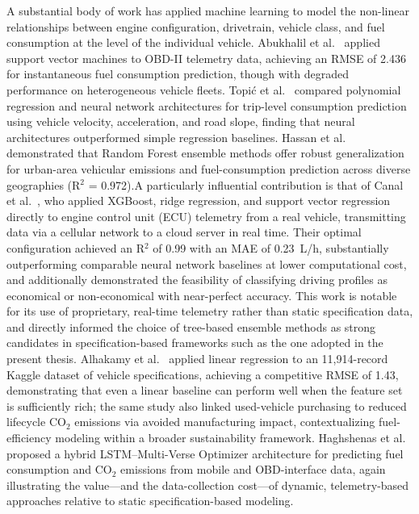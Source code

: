 A substantial body of work has applied machine learning to model the non-linear relationships between engine configuration, drivetrain, vehicle class, and fuel consumption at the level of the individual vehicle. Abukhalil et al.~\cite{abukhalil2020fuel} applied support vector machines to OBD-II telemetry data, achieving an RMSE of 2.436 for instantaneous fuel consumption prediction, though with degraded performance on heterogeneous vehicle fleets. Topić et al.~\cite{topic2022neural} compared polynomial regression and neural network architectures for trip-level consumption prediction using vehicle velocity, acceleration, and road slope, finding that neural architectures outperformed simple regression baselines. Hassan et al.~\cite{hassan2023random} demonstrated that Random Forest ensemble methods offer robust generalization for urban-area vehicular emissions and fuel-consumption prediction across diverse geographies (R$^2$ = 0.972).A particularly influential contribution is that of Canal et al.~\cite{canal2024machine}, who applied XGBoost, ridge regression, and support vector regression directly to engine control unit (ECU) telemetry from a real vehicle, transmitting data via a cellular network to a cloud server in real time. Their optimal configuration achieved an R$^2$ of 0.99 with an MAE of 0.23~L/h, substantially outperforming comparable neural network baselines at lower computational cost, and additionally demonstrated the feasibility of classifying driving profiles as economical or non-economical with near-perfect accuracy. This work is notable for its use of proprietary, real-time telemetry rather than static specification data, and directly informed the choice of tree-based ensemble methods as strong candidates in specification-based frameworks such as the one adopted in the present thesis.
Alhakamy et al.~\cite{alhakamy2023used} applied linear regression to an 11,914-record Kaggle dataset of vehicle specifications, achieving a competitive RMSE of 1.43, demonstrating that even a linear baseline can perform well when the feature set is sufficiently rich; the same study also linked used-vehicle purchasing to reduced lifecycle CO$_2$ emissions via avoided manufacturing impact, contextualizing fuel-efficiency modeling within a broader sustainability framework. Haghshenas et al.~\cite{haghshenas2025fuel} proposed a hybrid LSTM--Multi-Verse Optimizer architecture for predicting fuel consumption and CO$_2$ emissions from mobile and OBD-interface data, again illustrating the value---and the data-collection cost---of dynamic, telemetry-based approaches relative to static specification-based modeling.


